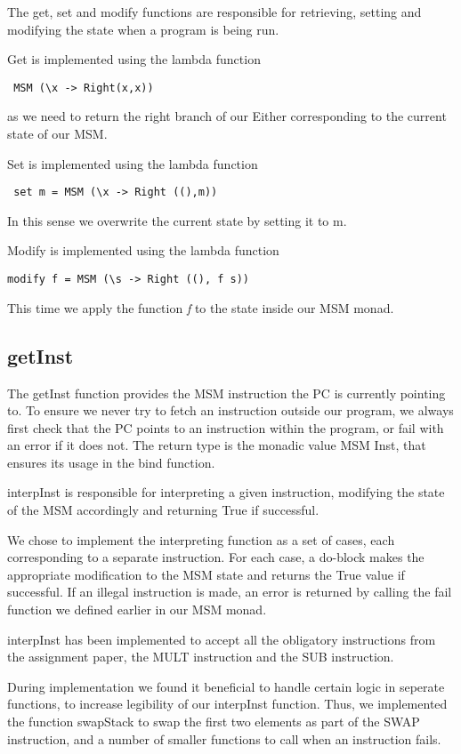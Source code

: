 \documentclass[]{article}
\begin{document}
The get, set and modify functions are responsible for retrieving, setting and modifying the state when a program is being run.\par

Get is implemented using the lambda function\begin{verbatim} MSM (\x -> Right(x,x)) \end{verbatim}as we need to return the right branch of our Either corresponding to the current state of our MSM.\par
Set is implemented using the lambda function\begin{verbatim} set m = MSM (\x -> Right ((),m))\end{verbatim} 
In this sense we overwrite the current state by setting it to m.\par
Modify is implemented using the lambda function \begin{verbatim}modify f = MSM (\s -> Right ((), f s))\end{verbatim} 
This time we apply the function \emph{f} to the state inside our MSM monad. \par

\subsection{getInst}

The getInst function provides the MSM instruction the PC is currently pointing to. To ensure we never try to fetch an instruction outside our program, we always first check that the PC points to an instruction within the program, or fail with an error if it does not. The return type is the monadic value MSM Inst, that ensures its usage in the bind function.\par
interpInst is responsible for interpreting a given instruction, modifying the state of the MSM accordingly and returning True if successful.\par

We chose to implement the interpreting function as a set of cases, each corresponding to a separate instruction. For each case, a do-block makes the appropriate modification to the MSM state and returns the True value if successful. If an illegal instruction is made, an error is returned by calling the fail function we defined earlier in our MSM monad.\par
interpInst has been implemented to accept all the obligatory instructions from the assignment paper, the MULT instruction and the SUB instruction.\par
During implementation we found it beneficial to handle certain logic in seperate functions, to increase legibility of our interpInst function. Thus, we implemented the function swapStack to swap the first two elements as part of the SWAP instruction, and a number of smaller functions to call when an instruction fails.\par
\end{document}

